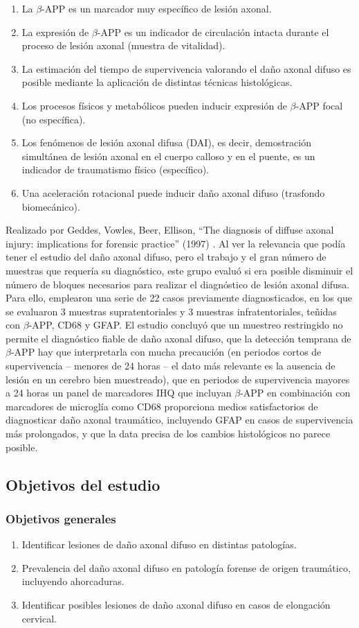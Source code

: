 \begin{enumerate}
	\item La $\beta$-APP es un marcador muy específico de lesión axonal.
	\item La expresión de $\beta$-APP es un indicador de circulación intacta durante el proceso de lesión axonal (muestra de vitalidad). 
	\item La estimación del tiempo de supervivencia valorando el daño axonal difuso es posible mediante la aplicación de distintas técnicas histológicas.
	\item Los procesos físicos y metabólicos pueden inducir expresión de $\beta$-APP focal (no específica). 
	\item Los fenómenos de lesión axonal difusa (DAI), es decir, demostración simultánea de lesión axonal en el cuerpo calloso y en el puente, es un indicador de traumatismo físico (específico). 
	\item Una aceleración rotacional puede inducir daño axonal difuso (trasfondo biomecánico). 
\end{enumerate}
Realizado por Geddes, Vowles, Beer, Ellison, “The diagnosis of diffuse axonal injury: implications for forensic practice” (1997) \cite{Geddes1997}. Al ver la relevancia que podía tener el estudio del daño axonal difuso, pero el trabajo y el gran número de muestras que requería su diagnóstico, este grupo evaluó si era posible disminuir el número de bloques necesarios para realizar el diagnóstico de lesión axonal difusa. Para ello, emplearon una serie de 22 casos previamente diagnosticados, en los que se evaluaron 3 muestras supratentoriales y 3 muestras infratentoriales, teñidas con $\beta$-APP, CD68 y GFAP. El estudio concluyó que un muestreo restringido no permite el diagnóstico fiable de daño axonal difuso, que la detección temprana de $\beta$-APP hay que interpretarla con mucha precaución (en periodos cortos de supervivencia – menores de 24 horas – el dato más relevante es la ausencia de lesión en un cerebro bien muestreado), que en periodos de supervivencia mayores a 24 horas un panel de marcadores IHQ que incluyan $\beta$-APP en combinación con marcadores de microglía como CD68 proporciona medios satisfactorios de diagnosticar daño axonal traumático, incluyendo GFAP en casos de supervivencia más prolongados, y que la data precisa de los cambios histológicos no parece posible.
\subsection{Objetivos del estudio}
\subsubsection{Objetivos generales}
\begin{enumerate}
	\item Identificar lesiones de daño axonal difuso en distintas patologías.
	\item Prevalencia del daño axonal difuso en patología forense de origen traumático, incluyendo ahorcaduras.
	\item Identificar posibles lesiones de daño axonal difuso en casos de elongación cervical. 
	
\end{enumerate}
